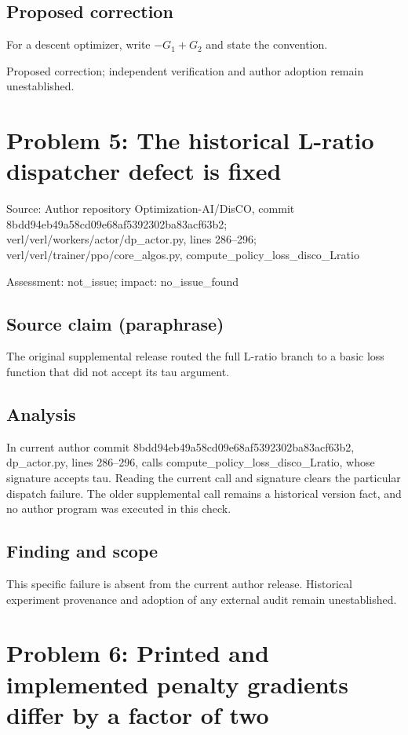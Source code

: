 \documentclass[11pt]{article}
\begin{document}
\subsection*{Proposed correction}

For a descent optimizer, write \(-G_1+G_2\) and state the convention.

Proposed correction; independent verification and author adoption remain unestablished.

\section*{Problem 5: The historical L-ratio dispatcher defect is fixed}

Source: Author repository Optimization-AI/DisCO, commit 8bdd94eb49a58cd09e68af5392302ba83acf63b2; verl/verl/workers/actor/dp\_actor.py, lines 286–296; verl/verl/trainer/ppo/core\_algos.py, compute\_policy\_loss\_disco\_Lratio

Assessment: not\_issue; impact: no\_issue\_found

\subsection*{Source claim (paraphrase)}

The original supplemental release routed the full L-ratio branch to a basic loss function that did not accept its tau argument.

\subsection*{Analysis}

In current author commit 8bdd94eb49a58cd09e68af5392302ba83acf63b2, dp\_actor.py, lines 286–296, calls compute\_policy\_loss\_disco\_Lratio, whose signature accepts tau. Reading the current call and signature clears the particular dispatch failure. The older supplemental call remains a historical version fact, and no author program was executed in this check.

\subsection*{Finding and scope}

This specific failure is absent from the current author release. Historical experiment provenance and adoption of any external audit remain unestablished.

\section*{Problem 6: Printed and implemented penalty gradients differ by a factor of two}
\end{document}
